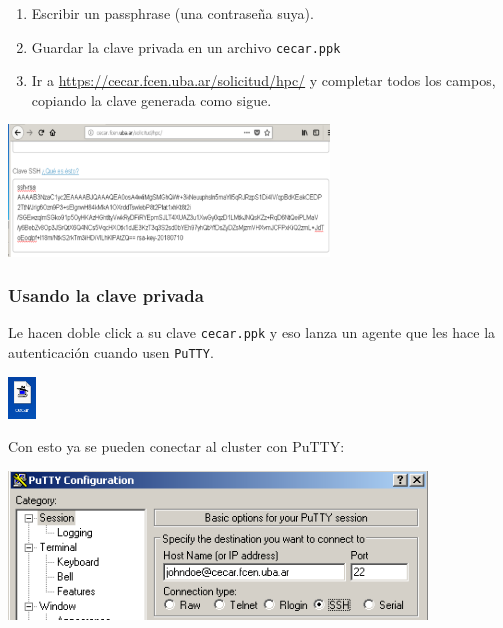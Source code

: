 \documentclass[handout]{beamer}
\begin{document}
\begin{frame}
\begin{enumerate}
  \item Escribir un passphrase (una contraseña suya).
  \item Guardar la clave privada en un archivo \Verb=cecar.ppk=
  \item Ir a \url{https://cecar.fcen.uba.ar/solicitud/hpc/} y completar todos los campos, copiando la clave generada como sigue.
\end{enumerate}
\begin{center}
  \includegraphics[width=23em]{./ssh-web-cecar}
  \end{center} 
\end{frame}

\begin{frame}
\frametitle{Usando la clave privada}
Le hacen doble click a su clave \Verb=cecar.ppk= y eso lanza un agente que les hace la autenticación cuando usen \Verb=PuTTY=.

\begin{center}
\includegraphics[width=2em]{cecarppk.png}
\end{center}

Con esto ya se pueden conectar al cluster con PuTTY:
\begin{center}
\includegraphics[width=30em]{putty-cfg.png}
\end{center}
\end{frame}
\end{document}
